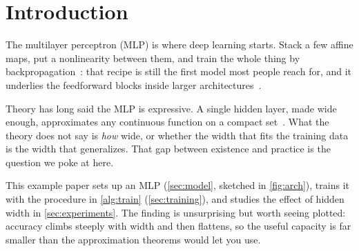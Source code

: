 \section{Introduction}
\label{sec:introduction}

The multilayer perceptron (MLP) is where deep learning starts.
Stack a few affine maps, put a nonlinearity between them, and train the whole
thing by backpropagation~\citep{rumelhart1986}: that recipe is still the first
model most people reach for, and it underlies the feedforward blocks inside
larger architectures~\citep{goodfellow2016}.

Theory has long said the MLP is expressive.
A single hidden layer, made wide enough, approximates any continuous function on
a compact set~\citep{cybenko1989, hornik1989}.
What the theory does not say is \emph{how} wide, or whether the width that fits
the training data is the width that generalizes.
That gap between existence and practice is the question we poke at here.

This example paper sets up an MLP (\cref{sec:model}, sketched in
\cref{fig:arch}), trains it with the procedure in \cref{alg:train}
(\cref{sec:training}), and studies the effect of hidden width in
\cref{sec:experiments}.
The finding is unsurprising but worth seeing plotted: accuracy climbs steeply
with width and then flattens, so the useful capacity is far smaller than the
approximation theorems would let you use.
